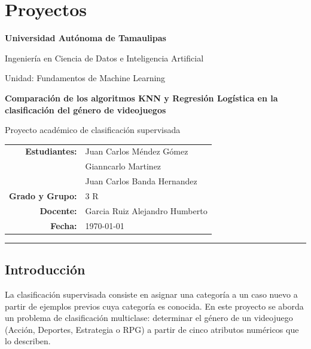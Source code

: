 \documentclass[]{article}
\begin{document}
\section{Proyectos}

\begin{center}
\vspace*{0.5cm}
{\Large\bfseries Universidad Autónoma de Tamaulipas\par} 
\vspace{0.4cm}
{\large Ingeniería en Ciencia de Datos e Inteligencia Artificial\par}
\vspace{0.4cm}
{\large Unidad: Fundamentos de Machine Learning\par}
\vspace{1.5cm}
{\huge\bfseries Comparación de los algoritmos KNN y Regresión Logística en la clasificación del género de videojuegos\par}
\vspace{1cm}
{\large Proyecto académico de clasificación supervisada\par}
\vspace{1.5cm}
\begin{tabular}{rl}
\textbf{Estudiantes:} & Juan Carlos Méndez Gómez \\ 
                      & Gianncarlo Martinez \\
                      & Juan Carlos Banda Hernandez \\
\textbf{Grado y Grupo:} & 3 R \\
\textbf{Docente:} & Garcia Ruiz Alejandro Humberto \\ 
\textbf{Fecha:} & \today \\
\end{tabular}
\vspace{1.5cm}
\end{center}

\hrule
\vspace{1cm}

\subsection{Introducción}

La clasificación supervisada consiste en asignar una categoría a un caso nuevo a partir de ejemplos previos cuya categoría es conocida. En este proyecto se aborda un problema de clasificación multiclase: determinar el género de un videojuego (Acción, Deportes, Estrategia o RPG) a partir de cinco atributos numéricos que lo describen.
\end{document}
